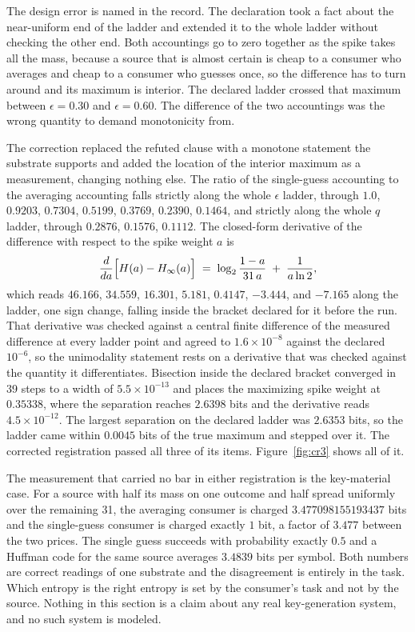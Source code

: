 \documentclass[aps,pre,reprint,nofootinbib]{revtex4-2}
\begin{document}
The design error is named in the record.  The declaration took a fact
about the near-uniform end of the ladder and extended it to the whole
ladder without checking the other end.  Both accountings go to zero
together as the spike takes all the mass, because a source that is
almost certain is cheap to a consumer who averages and cheap to a
consumer who guesses once, so the difference has to turn around and
its maximum is interior.  The declared ladder crossed that maximum
between $\epsilon = 0.30$ and $\epsilon = 0.60$.  The difference of
the two accountings was the wrong quantity to demand monotonicity
from.

The correction replaced the refuted clause with a monotone statement
the substrate supports and added the location of the interior maximum
as a measurement, changing nothing else.  The ratio of the
single-guess accounting to the averaging accounting falls strictly
along the whole $\epsilon$ ladder, through
$1.0$, $0.9203$, $0.7304$, $0.5199$, $0.3769$, $0.2390$, $0.1464$, and
strictly along the whole $q$ ladder, through $0.2876$, $0.1576$,
$0.1112$.  The closed-form derivative of the difference with respect
to the spike weight $a$ is
\begin{equation}
  \frac{d}{da}\Bigl[H(a) - H_\infty(a)\Bigr]
  \;=\; \log_2\frac{1-a}{31\,a} \;+\; \frac{1}{a \ln 2},
  \label{eq:deriv}
\end{equation}
which reads $46.166$, $34.559$, $16.301$, $5.181$, $0.4147$,
$-3.444$, and $-7.165$ along the ladder, one sign change, falling
inside the bracket declared for it before the run.  That derivative
was checked against a central finite difference of the measured
difference at every ladder point and agreed to
$1.6 \times 10^{-8}$ against the declared $10^{-6}$, so the
unimodality statement rests on a derivative that was checked against
the quantity it differentiates.  Bisection inside the declared bracket
converged in 39 steps to a width of $5.5\times10^{-13}$ and places the
maximizing spike weight at $0.35338$, where the separation reaches
$2.6398$ bits and the derivative reads $4.5 \times 10^{-12}$.  The
largest separation on the declared ladder was $2.6353$ bits, so the
ladder came within $0.0045$ bits of the true maximum and stepped over
it.  The corrected registration passed all three of its items.
Figure~\ref{fig:cr3} shows all of it.

The measurement that carried no bar in either registration is the
key-material case.  For a source with half its mass on one outcome and
half spread uniformly over the remaining 31, the averaging consumer is
charged $3.477098155193437$ bits and the single-guess consumer is
charged exactly $1$ bit, a factor of $3.477$ between the two prices.
The single guess succeeds with probability exactly $0.5$ and a Huffman
code for the same source averages $3.4839$ bits per symbol.  Both
numbers are correct readings of one substrate and the disagreement is
entirely in the task.  Which entropy is the right entropy is set by
the consumer's task and not by the source.  Nothing in this section is
a claim about any real key-generation system, and no such system is
modeled.
\end{document}
